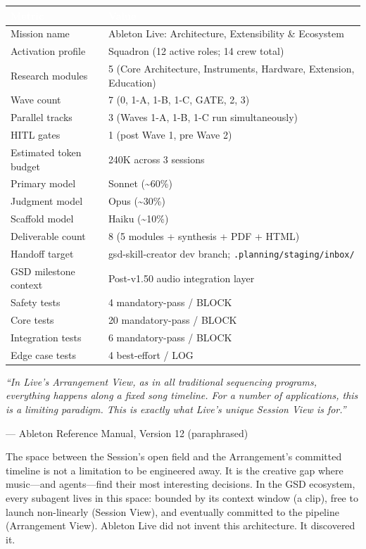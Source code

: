\documentclass[11pt,letterpaper]{article}
\newcommand{\tableheader}[1]{\textbf{\sffamily\textcolor{white}{#1}}}
\begin{document}
\begin{center}
\begin{tabularx}{\textwidth}{L{5cm}X}
\toprule
{}
\tableheader{Metric} & \tableheader{Value} \\
\midrule
Mission name & Ableton Live: Architecture, Extensibility \& Ecosystem \\
Activation profile & Squadron (12 active roles; 14 crew total) \\
Research modules & 5 (Core Architecture, Instruments, Hardware, Extension, Education) \\
Wave count & 7 (0, 1-A, 1-B, 1-C, GATE, 2, 3) \\
Parallel tracks & 3 (Waves 1-A, 1-B, 1-C run simultaneously) \\
HITL gates & 1 (post Wave 1, pre Wave 2) \\
Estimated token budget & 240K across 3 sessions \\
Primary model & Sonnet (\textasciitilde 60\%) \\
Judgment model & Opus (\textasciitilde 30\%) \\
Scaffold model & Haiku (\textasciitilde 10\%) \\
Deliverable count & 8 (5 modules + synthesis + PDF + HTML) \\
Handoff target & gsd-skill-creator dev branch; \texttt{.planning/staging/inbox/} \\
GSD milestone context & Post-v1.50 audio integration layer \\
Safety tests & 4 mandatory-pass / BLOCK \\
Core tests & 20 mandatory-pass / BLOCK \\
Integration tests & 6 mandatory-pass / BLOCK \\
Edge case tests & 4 best-effort / LOG \\
\bottomrule
\end{tabularx}
\end{center}

\vspace{2em}

\begin{quotebox}
\textit{``In Live's Arrangement View, as in all traditional sequencing programs, everything
happens along a fixed song timeline. For a number of applications, this is a limiting paradigm.
This is exactly what Live's unique Session View is for.''}

\vspace{0.5em}
{\small\sffamily\textcolor{subtlegray}{--- Ableton Reference Manual, Version 12 (paraphrased)}}

\vspace{1em}
\noindent The space between the Session's open field and the Arrangement's committed timeline
is not a limitation to be engineered away. It is the creative gap where music---and
agents---find their most interesting decisions. In the GSD ecosystem, every subagent lives
in this space: bounded by its context window (a clip), free to launch non-linearly (Session
View), and eventually committed to the pipeline (Arrangement View). Ableton Live did not
invent this architecture. It discovered it.
\end{quotebox}
\end{document}
